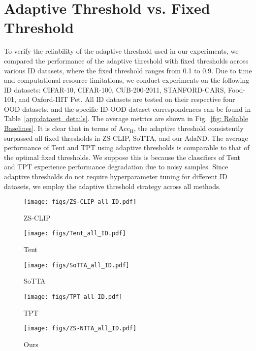 \section{Adaptive Threshold vs. Fixed Threshold}\label{app:adaptive_threshold}
To verify the reliability of the adaptive threshold used in our experiments, we compared the performance of the adaptive threshold with fixed thresholds across various ID datasets, where the fixed threshold ranges from 0.1 to 0.9. Due to time and computational resource limitations, we conduct experiments on the following ID datasets: CIFAR-10, CIFAR-100, CUB-200-2011, STANFORD-CARS, Food-101, and Oxford-IIIT Pet. All ID datasets are tested on their respective four OOD datasets, and the specific ID-OOD dataset correspondences can be found in Table~\ref{app:dataset_details}.
The average metrics are shown in Fig.~\ref{fig: Reliable Baselines}. It is clear that in terms of $\text{Acc}_\text{H}$, the adaptive threshold consistently surpassed all fixed thresholds in ZS-CLIP, SoTTA, and our AdaND. The average performance of Tent and TPT using adaptive thresholds is comparable to that of the optimal fixed thresholds. We suppose this is because the classifiers of Tent and TPT experience performance degradation due to noisy samples. Since adaptive thresholds do not require hyperparameter tuning for different ID datasets, we employ the adaptive threshold strategy across all methods.


\begin{figure*}[h]
\centering
\begin{subfigure}{0.48\textwidth}
\centering
\texttt{[image: figs/ZS-CLIP\_all\_ID.pdf]}
\caption{ZS-CLIP}
\end{subfigure}
\hfill
\begin{subfigure}{0.48\textwidth}
\centering
\texttt{[image: figs/Tent\_all\_ID.pdf]}
\caption{Tent}
\end{subfigure}

\begin{subfigure}{0.48\textwidth}
\centering
\texttt{[image: figs/SoTTA\_all\_ID.pdf]}
\caption{SoTTA}
\end{subfigure}
\hfill
\begin{subfigure}{0.48\textwidth}
\centering
\texttt{[image: figs/TPT\_all\_ID.pdf]}
\caption{TPT}
\end{subfigure}

\begin{subfigure}{0.48\textwidth}
\centering
\texttt{[image: figs/ZS-NTTA\_all\_ID.pdf]}
\caption{Ours}
\end{subfigure}

\caption{Results about Adaptive threshold(dashed line) and fixed threshold(solid line) range from 0.1 to 0.9. Best viewed with zoom-in.}\label{fig: Reliable Baselines}
\end{figure*}